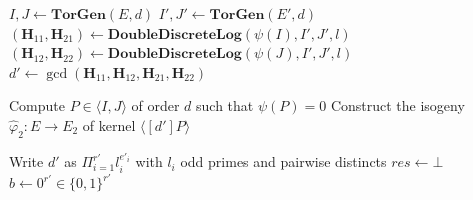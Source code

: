 \documentclass[12pt,a4paper]{article}
\begin{document}
				\begin{algorithm}
					\caption{Extraction of $\varphi$ from $\psi$}
					\label{algo:extraction}
					\DontPrintSemicolon
					$I,J\gets \mathbf{TorGen}(E,d)$ \;
					$I',J'\gets \mathbf{TorGen}(E',d)$\;
					$(\mathbf H_{11},\mathbf H_{21})\gets\mathbf{DoubleDiscreteLog}(\psi(I),I',J',l)$\;
					$(\mathbf H_{12},\mathbf H_{22})\gets\mathbf{DoubleDiscreteLog}(\psi(J),I',J',l)$\;
					$d'\gets \gcd(\mathbf	H_{11},\mathbf H_{12},\mathbf H_{21},\mathbf H_{22})$ \label{line:dprime}

					Compute $P\in\langle I,J\rangle$ of order $d$ such that $\psi(P)=0$\;
					Construct the isogeny $\widehat\varphi_2:E\to E_2$
					of kernel  $\langle [d']P\rangle$\;\label{line:phi2}

					Write $d'$ as $\Pi_{i=1}^{r'}l_i^{e'_i}$ with $l_i$ odd primes and pairwise distincts\;
					$res\gets\bot$\;\label{line:jsp}
					$b\gets 0^{r'}\in\{0,1\}^{r'}$\;


\end{algorithm}
\end{document}
